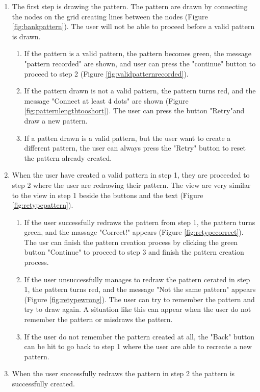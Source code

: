       \begin{enumerate}[leftmargin=0.3in]
        \item The first step is drawing the pattern. The pattern are drawn by connecting the nodes on the grid creating lines between the nodes (Figure \ref{fig:bankpattern}). The user will not be able to proceed before a valid pattern is drawn.
          \begin{enumerate}
            \item If the pattern is a valid pattern, the pattern becomes green, the message "pattern recorded" are shown, and user can press the "continue" button to proceed to step 2 (Figure \ref{fig:validpatternrecorded}). 
            \item If the pattern drawn is not a valid pattern, the pattern turns red, and the message "Connect at least 4 dots" are shown (Figure \ref{fig:patternlengthtooshort}). The user can press the button "Retry"and draw a new pattern.
            \item If a patten drawn is a valid pattern, but the user want to create a different pattern, the user can always press the "Retry" button to reset the pattern already created. 
          \end{enumerate}
        \item When the user have created a valid pattern in step 1, they are proceeded to step 2 where the user are redrawing their pattern. The view are very similar to the view in step 1 beside the buttons and the text (Figure \ref{fig:retypepattern}).
          \begin{enumerate}
            \item If the user successfully redraws the pattern from step 1, the pattern turns green, and the massage "Correct!" appears (Figure \ref{fig:retypecorrect}). The usr can finish the pattern creation process by clicking the green button "Continue" to proceed to step 3 and finish the pattern creation process.
            \item If the user unsuccessfully manages to redraw the pattern cerated in step 1, the pattern turns red, and the message "Not the same pattern" appears (Figure \ref{fig:retypewrong}). The user can try to remember the pattern and try to draw again. A situation like this can appear when the user do not remember the pattern or misdraws the pattern.  
            \item If the user do not remember the pattern created at all, the "Back" button can be hit to go back to step 1 where the user are able to recreate a new pattern. 
          \end{enumerate}
        \item When the user successfully redraws the pattern in step 2 the pattern is successfully created.
      \end{enumerate}

